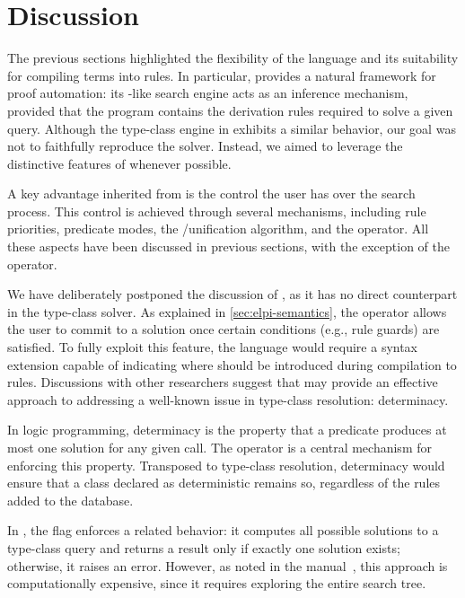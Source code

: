 \section{Discussion}
\label{sec:tc-discussion}

The previous sections highlighted the flexibility of the \elpi language and its
suitability for compiling \rocq terms into \elpi rules. In particular, \elpi
provides a natural framework for proof automation: its \prolog-like search engine
acts as an inference mechanism, provided that the program contains the
derivation rules required to solve a given query. Although the type-class engine
in \rocq exhibits a similar behavior, our goal was not to faithfully reproduce
the \rocq solver. Instead, we aimed to leverage the distinctive features of \elpi
whenever possible.

A key advantage inherited from \elpi is the control the user has over the search
process. This control is achieved through several mechanisms, including rule
priorities, predicate modes, the \unify/\matching unification algorithm, and the
\cut operator. All these aspects have been discussed in previous sections, with
the exception of the \cut operator.

We have deliberately postponed the discussion of \cut, as it has no direct
counterpart in the \rocq type-class solver. As explained in
\cref{sec:elpi-semantics}, the \cut operator allows the user to commit to a
solution once certain conditions (e.g., rule guards) are satisfied. To fully
exploit this feature, the \rocq language would require a syntax extension capable of
indicating where \cut should be introduced during compilation to \elpi rules.
Discussions with other researchers suggest that \cut may provide an effective
approach to addressing a well-known issue in type-class resolution: determinacy.

In logic programming, determinacy is the property that a predicate produces at
most one solution for any given call. The \cut operator is a central mechanism
for enforcing this property. Transposed to type-class resolution, determinacy
would ensure that a class declared as deterministic remains so, regardless of
the rules added to the database.

In \rocq, the flag  enforces a related
behavior: it computes all possible solutions to a type-class query and returns a
result only if exactly one solution exists; otherwise, it raises an error.
However, as noted in the \rocq manual~\cite{rocq_class_command}, this approach is
computationally expensive, since it requires exploring the entire search tree.


